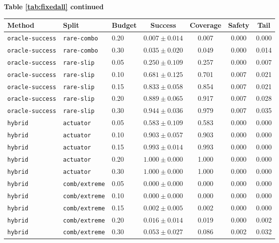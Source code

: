 \documentclass{article}
\begin{document}
\begin{center}
\textbf{Table \ref{tab:fixedall} continued}\\[0.4ex]
\begin{tabular}{lllcccc}
\toprule
Method & Split & Budget & Success & Coverage & Safety & Tail \\
\midrule
\texttt{oracle-success} & \texttt{rare-combo} & 0.20 & $0.007 \pm 0.014$ & 0.007 & 0.000 & 0.000 \\
\texttt{oracle-success} & \texttt{rare-combo} & 0.30 & $0.035 \pm 0.020$ & 0.049 & 0.000 & 0.014 \\
\texttt{oracle-success} & \texttt{rare-slip} & 0.05 & $0.250 \pm 0.109$ & 0.257 & 0.000 & 0.007 \\
\texttt{oracle-success} & \texttt{rare-slip} & 0.10 & $0.681 \pm 0.125$ & 0.701 & 0.007 & 0.021 \\
\texttt{oracle-success} & \texttt{rare-slip} & 0.15 & $0.833 \pm 0.058$ & 0.854 & 0.007 & 0.021 \\
\texttt{oracle-success} & \texttt{rare-slip} & 0.20 & $0.889 \pm 0.065$ & 0.917 & 0.007 & 0.028 \\
\texttt{oracle-success} & \texttt{rare-slip} & 0.30 & $0.944 \pm 0.036$ & 0.979 & 0.007 & 0.035 \\
\texttt{hybrid} & \texttt{actuator} & 0.05 & $0.583 \pm 0.109$ & 0.583 & 0.000 & 0.000 \\
\texttt{hybrid} & \texttt{actuator} & 0.10 & $0.903 \pm 0.057$ & 0.903 & 0.000 & 0.000 \\
\texttt{hybrid} & \texttt{actuator} & 0.15 & $0.993 \pm 0.014$ & 0.993 & 0.000 & 0.000 \\
\texttt{hybrid} & \texttt{actuator} & 0.20 & $1.000 \pm 0.000$ & 1.000 & 0.000 & 0.000 \\
\texttt{hybrid} & \texttt{actuator} & 0.30 & $1.000 \pm 0.000$ & 1.000 & 0.000 & 0.000 \\
\texttt{hybrid} & \texttt{comb/extreme} & 0.05 & $0.000 \pm 0.000$ & 0.000 & 0.000 & 0.000 \\
\texttt{hybrid} & \texttt{comb/extreme} & 0.10 & $0.000 \pm 0.000$ & 0.000 & 0.000 & 0.000 \\
\texttt{hybrid} & \texttt{comb/extreme} & 0.15 & $0.002 \pm 0.005$ & 0.002 & 0.000 & 0.000 \\
\texttt{hybrid} & \texttt{comb/extreme} & 0.20 & $0.016 \pm 0.014$ & 0.019 & 0.000 & 0.002 \\
\texttt{hybrid} & \texttt{comb/extreme} & 0.30 & $0.053 \pm 0.027$ & 0.086 & 0.002 & 0.032 \\

\end{tabular}
\end{center}
\end{document}
